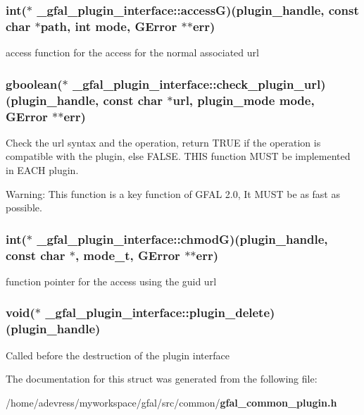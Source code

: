 \subsubsection{\setlength{\rightskip}{0pt plus 5cm}int($\ast$ \bf{\_\-gfal\_\-plugin\_\-interface::access\-G})(plugin\_\-handle, const char $\ast$path, int mode, GError $\ast$$\ast$err)}\label{struct__gfal__plugin__interface_1fa81d7a219629281c14b05116d32202}


access function for the access for the normal associated url 
\subsubsection{\setlength{\rightskip}{0pt plus 5cm}gboolean($\ast$ \bf{\_\-gfal\_\-plugin\_\-interface::check\_\-plugin\_\-url})(plugin\_\-handle, const char $\ast$url, plugin\_\-mode mode, GError $\ast$$\ast$err)}\label{struct__gfal__plugin__interface_e1ab2d2c3ea35095446a2c14734b5f4c}


Check the url syntax and the operation, return TRUE if the operation is compatible with the plugin, else FALSE. THIS function MUST be implemented in EACH plugin. \begin{Desc}
\item[Warning:]This function is a key function of GFAL 2.0, It MUST be as fast as possible. \end{Desc}
\subsubsection{\setlength{\rightskip}{0pt plus 5cm}int($\ast$ \bf{\_\-gfal\_\-plugin\_\-interface::chmod\-G})(plugin\_\-handle, const char $\ast$, mode\_\-t, GError $\ast$$\ast$err)}\label{struct__gfal__plugin__interface_e032ec6f13423ea516ca4c02332f5ecf}


function pointer for the access using the guid url 
\subsubsection{\setlength{\rightskip}{0pt plus 5cm}void($\ast$ \bf{\_\-gfal\_\-plugin\_\-interface::plugin\_\-delete})(plugin\_\-handle)}\label{struct__gfal__plugin__interface_d146f62bd310f1f265f0bc3c37cc70d8}


Called before the destruction of the plugin interface 

The documentation for this struct was generated from the following file:\begin{CompactItemize}
\item 
/home/adevress/myworkspace/gfal/src/common/\bf{gfal\_\-common\_\-plugin.h}\end{CompactItemize}

